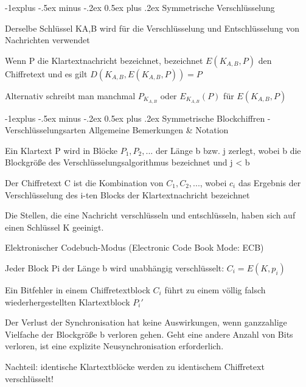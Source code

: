 \documentclass[a4paper]{article}
\makeatletter
\renewcommand{\subsection}{\@startsection{subsection}{2}{0mm}%
 {-1explus -.5ex minus -.2ex}%
 {0.5ex plus .2ex}%
 {\normalfont\normalsize\bfseries}}
\makeatother
\begin{document}
\begin{multicols}{3}
      \subsection{Symmetrische Verschlüsselung}
      \begin{itemize*}
            \item Derselbe Schlüssel KA,B wird für die Verschlüsselung und Entschlüsselung von Nachrichten verwendet
            \item Wenn P die Klartextnachricht bezeichnet, bezeichnet $E(K_{A,B}, P)$ den Chiffretext und es gilt $D(K_{A,B}, E(K_{A,B}, P)) = P$
            \item Alternativ schreibt man manchmal $P_{K_{A,B}}$ oder $E_{K_{A,B}}(P)$ für $E(K_{A,B}, P)$
      \end{itemize*}

      \subsection{Symmetrische Blockchiffren - Verschlüsselungsarten}
      Allgemeine Bemerkungen \& Notation
      \begin{itemize*}
            \item Ein Klartext P wird in Blöcke $P_1, P_2, ...$ der Länge b bzw. j zerlegt, wobei b die Blockgröße des Verschlüsselungsalgorithmus bezeichnet und j < b
            \item Der Chiffretext C ist die Kombination von $C_1, C_2, ...$, wobei $c_i$ das Ergebnis der Verschlüsselung des i-ten Blocks der Klartextnachricht bezeichnet
            \item Die Stellen, die eine Nachricht verschlüsseln und entschlüsseln, haben sich auf einen Schlüssel K geeinigt.
      \end{itemize*}

      Elektronischer Codebuch-Modus (Electronic Code Book Mode: ECB)
      \begin{itemize*}
            \item Jeder Block Pi der Länge b wird unabhängig verschlüsselt: $C_i = E(K, p_i)$
            \item Ein Bitfehler in einem Chiffretextblock $C_i$ führt zu einem völlig falsch wiederhergestellten Klartextblock $P_i'$
            \item Der Verlust der Synchronisation hat keine Auswirkungen, wenn ganzzahlige Vielfache der Blockgröße b verloren gehen. Geht eine andere Anzahl von Bits verloren, ist eine explizite Neusynchronisation erforderlich.
            \item Nachteil: identische Klartextblöcke werden zu identischem Chiffretext verschlüsselt!
      \end{itemize*}


\end{multicols}
\end{document}
